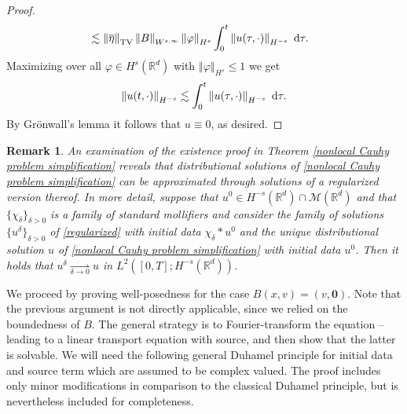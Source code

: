 \documentclass[11pt,reqno]{amsart}
\newtheorem{rem}[thm]{Remark}
\numberwithin{equation}{section}
\def\dd{{\rm d}}
\begin{document}
\begin{proof}
\begin{align*}
&\lesssim \left\Vert \overline{\eta}\right\Vert_{\mathrm{TV}}\left\Vert B\right\Vert_{W^{s,\infty}}\left\Vert \varphi\right\Vert_{H^{s}}\int_{0}^{t}\left\Vert u(\tau,\cdot)\right\Vert_{H^{-s}}\ \dd \tau.             
\end{align*}
Maximizing over all $\varphi\in H^{s}(\mathbb{R}^{d})$ with $\left\Vert \varphi\right\Vert_{H^{s}}\leq 1$ we get 
\begin{align*}
\left\Vert u(t,\cdot)\right\Vert_{H^{-s}}\lesssim \int_{0}^{t}\left\Vert u(\tau,\cdot)\right\Vert_{H^{-s}}\ \dd \tau.      
\end{align*}
By Gr\"onwall's lemma it follows that $u\equiv 0$, as desired. 
\end{proof}
\begin{rem}
An examination of the existence proof in Theorem \ref{nonlocal Cauhy problem simplification} reveals that distributional solutions of \eqref{nonlocal Cauhy problem simplification} can be approximated through solutions of a regularized version thereof. In more detail, suppose that $u^{0}\in H^{-s}(\mathbb{R}^{d})\cap \mathcal{M}(\mathbb{R}^{d})$ and that $\{\chi_{\delta}\}_{\delta >0}$ is a family of standard mollifiers and consider the family of solutions $\{u^{\delta}\}_{\delta>0}$ of \eqref{regularized} with initial data $\chi_{\delta }\ast u^{0}$ and the unique distributional solution $u$ of \eqref{nonlocal Cauhy problem simplification} with initial data $u^{0}$. Then it holds that   $u^{\delta}\underset{\delta \rightarrow 0}{\rightharpoonup} u$ in $L^{2}([0,T];H^{-s}
(\mathbb{R}^{d}))$. \label{Remark about approximating measure valued solutions}     
\end{rem}
We proceed by proving well-posedness for the case $B(x,v)=(v,\mathbf{0})$. Note that the previous argument is not directly applicable, since we relied on the boundedness of $B$. The general strategy is to Fourier-transform the equation -- leading to a linear transport equation with source, and then show that the latter is solvable. We will need the following general Duhamel principle for initial data and source term which are assumed to be complex valued. The proof includes only minor modifications in comparison to the classical Duhamel principle, but is nevertheless included for completeness.     
\end{document}
